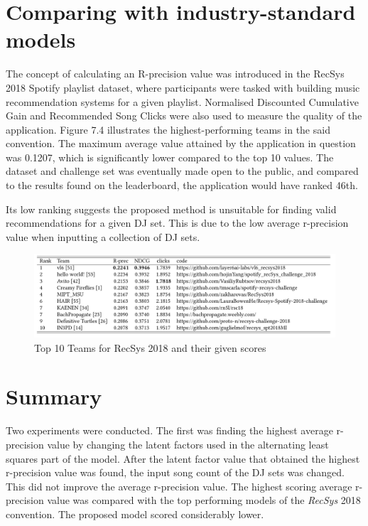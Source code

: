 \section{Comparing with industry-standard models}

The concept of calculating an R-precision value was introduced in the RecSys 2018 Spotify playlist dataset, where participants were tasked with building music recommendation systems for a given playlist. Normalised Discounted Cumulative Gain and Recommended Song Clicks were also used to measure the quality of the application. Figure 7.4 illustrates the highest-performing teams in the said convention. The maximum average value attained by the application in question was 0.1207, which is significantly lower compared to the top 10 values. The dataset and challenge set was eventually made open to the public, and compared to the results found on the leaderboard, the application would have ranked 46th. 

Its low ranking suggests the proposed method is unsuitable for finding valid recommendations for a given DJ set. This is due to the low average r-precision value when inputting a collection of DJ sets.
\begin{figure}[H]
	\hspace*{-0.5cm} 
	\includegraphics[scale=0.55]{images/recsys_scores}
	\caption{Top 10 Teams for RecSys 2018 and their given scores \citep{zamani_analysis_2019}} 
\end{figure}

\section{Summary}
Two experiments were conducted. The first was finding the highest average r-precision value by changing the latent factors used in the alternating least squares part of the model. After the latent factor value that obtained the highest r-precision value was found, the input song count of the DJ sets was changed. This did not improve the average r-precision value. The highest scoring average r-precision value was compared with the top performing models of the \textit{RecSys} 2018 convention. The proposed model scored considerably lower. 
